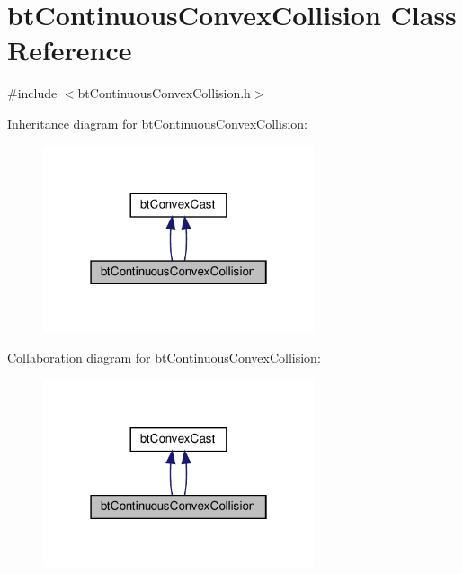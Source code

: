 \hypertarget{classbtContinuousConvexCollision}{}\section{bt\+Continuous\+Convex\+Collision Class Reference}
\label{classbtContinuousConvexCollision}


{\ttfamily \#include $<$bt\+Continuous\+Convex\+Collision.\+h$>$}



Inheritance diagram for bt\+Continuous\+Convex\+Collision\+:
\nopagebreak
\begin{figure}[H]
\begin{center}
\leavevmode
\includegraphics[width=226pt]{classbtContinuousConvexCollision__inherit__graph}
\end{center}
\end{figure}


Collaboration diagram for bt\+Continuous\+Convex\+Collision\+:
\nopagebreak
\begin{figure}[H]
\begin{center}
\leavevmode
\includegraphics[width=226pt]{classbtContinuousConvexCollision__coll__graph}
\end{center}
\end{figure}
